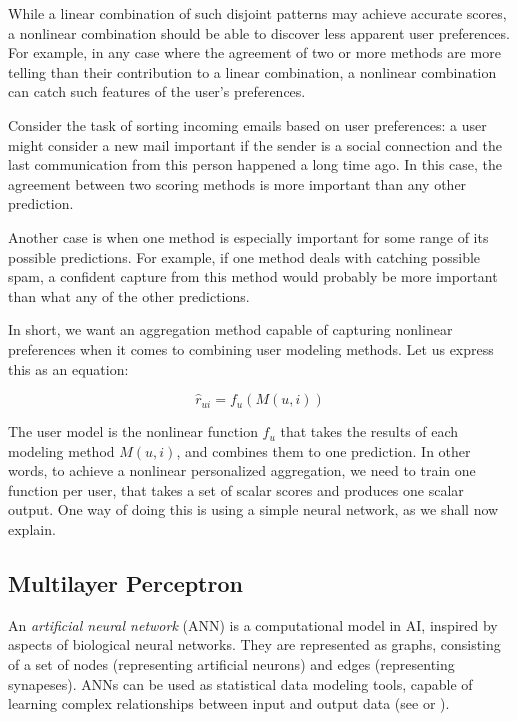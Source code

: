 While a linear combination of such disjoint patterns may achieve accurate scores,
a nonlinear combination should be able to discover less apparent user preferences.
For example, in any case where the agreement of two or more methods are more telling than their contribution
to a linear combination, a nonlinear combination can catch such features of the user's preferences.

Consider the task of sorting incoming emails based on user preferences: 
a user might consider a new mail important if the sender is a social connection
and the last communication from this person happened a long time ago. 
In this case, the agreement between two scoring methods is more important
than any other prediction.

Another case is when one method is especially important for some 
range of its possible predictions. For example, if one method deals with catching possible spam,
a confident capture from this method would probably be more important than 
what any of the other predictions.

In short, we want an aggregation method capable of capturing nonlinear preferences
when it comes to combining user modeling methods.
Let us express this as an equation:

\begin{equation*}
  \hat{r}_{ui} = f_{u}(M(u,i))
\end{equation*}

The user model is the nonlinear function $f_u$ that takes the results of each modeling method $M(u,i)$,
and combines them to one prediction.
In other words, to achieve a nonlinear personalized aggregation, we need to train one function per user,
that takes a set of scalar scores and produces one scalar output.
One way of doing this is using a simple neural network, as we shall now explain.

\subsection{Multilayer Perceptron}

An \emph{artificial neural network} (ANN) is a computational model in AI,
inspired by aspects of biological neural networks.
They are represented as graphs, consisting of a set of nodes (representing artificial neurons) and
edges (representing synapeses).
ANNs can be used as statistical data modeling tools, capable of learning complex
relationships between input and output data
(see \citet[p567]{Russell1995} or \citet[p163]{Floreano2008}).

